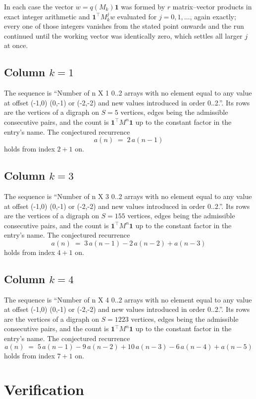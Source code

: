 \documentclass[11pt,a4paper]{article}
\theoremstyle{plain}
\theoremstyle{definition}
\begin{document}
In each case the vector $w=q(M_k)\mathbf{1}$ was formed by $r$ matrix--vector products in
exact integer arithmetic and $\mathbf{1}^{\!\top}M_k^{j}w$ evaluated for $j=0,1,\dots$,
again exactly; every one of those integers vanishes from the stated point onwards and the run
continued until the working vector was identically zero, which settles all larger $j$ at once.

\subsection*{Column $k$$=1$}
The sequence is ``Number of n X 1 0..2 arrays with no element equal to any value at offset (-1,0) (0,-1) or (-2,-2) and new values introduced in order 0..2.''. Its rows are the vertices of a digraph on
$S=5$ vertices, edges being the admissible consecutive pairs, and the count is
$\mathbf{1}^{\!\top}M^{n}\mathbf{1}$ up to the constant factor in the entry's name.
The conjectured recurrence
\[
a(n)\;=\;2\,a(n-1)
\]
holds from index $2+1$ on.

\subsection*{Column $k$$=3$}
The sequence is ``Number of n X 3 0..2 arrays with no element equal to any value at offset (-1,0) (0,-1) or (-2,-2) and new values introduced in order 0..2.''. Its rows are the vertices of a digraph on
$S=155$ vertices, edges being the admissible consecutive pairs, and the count is
$\mathbf{1}^{\!\top}M^{n}\mathbf{1}$ up to the constant factor in the entry's name.
The conjectured recurrence
\[
a(n)\;=\;3\,a(n-1) - 2\,a(n-2) + a(n-3)
\]
holds from index $4+1$ on.

\subsection*{Column $k$$=4$}
The sequence is ``Number of n X 4 0..2 arrays with no element equal to any value at offset (-1,0) (0,-1) or (-2,-2) and new values introduced in order 0..2.''. Its rows are the vertices of a digraph on
$S=1223$ vertices, edges being the admissible consecutive pairs, and the count is
$\mathbf{1}^{\!\top}M^{n}\mathbf{1}$ up to the constant factor in the entry's name.
The conjectured recurrence
\[
a(n)\;=\;5\,a(n-1) - 9\,a(n-2) + 10\,a(n-3) - 6\,a(n-4) + a(n-5)
\]
holds from index $7+1$ on.

\section{Verification}
\end{document}
